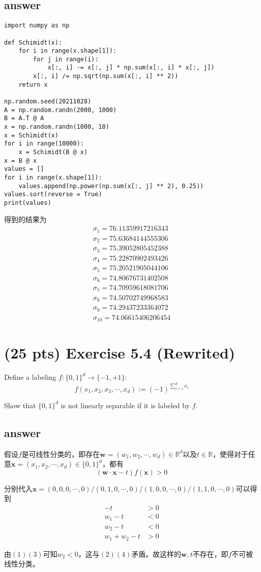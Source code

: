 \documentclass[11pt]{article}
\begin{document}
  \subsection*{answer}
  \begin{verbatim}
import numpy as np

def Schimidt(x):
    for i in range(x.shape[1]):
        for j in range(i):
            x[:, i] -= x[:, j] * np.sum(x[:, i] * x[:, j])
        x[:, i] /= np.sqrt(np.sum(x[:, i] ** 2))
    return x

np.random.seed(20211028)
A = np.random.randn(2000, 1000)
B = A.T @ A
x = np.random.randn(1000, 10)
x = Schimidt(x)
for i in range(10000):
    x = Schimidt(B @ x)
x = B @ x
values = []
for i in range(x.shape[1]):
    values.append(np.power(np.sum(x[:, j] ** 2), 0.25))
values.sort(reverse = True)
print(values)
  \end{verbatim}
得到的结果为
\begin{align*}
\sigma_1 = 76.11359917216343\\
\sigma_2 = 75.63684144555306\\
\sigma_3 = 75.39052805452388\\
\sigma_4 = 75.22870902493426\\
\sigma_5 = 75.20521905044106\\
\sigma_6 = 74.80676731402508\\
\sigma_7 = 74.70959618081706\\
\sigma_8 = 74.50702749968583\\
\sigma_9 = 74.29437233364072\\
\sigma_{10} = 74.06615406206454
\end{align*}
  \section{(25 pts) Exercise 5.4 (Rewrited)} 
 
 Define a labeling $f:\{0,1\}^d\to \{-1,+1\}$:
 $$f(x_1,x_2,x_3,\cdots,x_d):=(-1)^{\sum_{i=1}^d x_i}$$
 
 Show that $\{0,1\}^d$ is not linearly separable if it is labeled by $f$.

\subsection*{answer}

假设$f$是可线性分类的，即存在$\mathbf w = (w_1, w_2, \cdots, w_d) \in \mathbb R^d$以及$t \in \mathbb R$，使得对于任意$\mathbf x = (x_1, x_2, \cdots, x_d) \in \{0, 1\}^d$，都有$$(\mathbf w \cdot \mathbf x - t) f(\mathbf x) > 0$$

分别代入$\mathbf x = (0, 0, 0, \cdots, 0) / (0, 1, 0, \cdots, 0) / (1, 0, 0, \cdots, 0) / (1, 1, 0, \cdots, 0)$可以得到
\begin{align}
-t &> 0\\
w_1 - t &< 0\\
w_2 - t &< 0\\
w_1 + w_2 - t &> 0
\end{align}

由$(1)(3)$可知$w_2 < 0$，这与$(2)(4)$矛盾。故这样的$\mathbf w, t$不存在，即$f$不可被线性分类。
\end{document}
